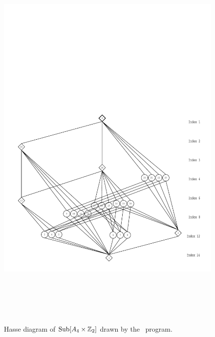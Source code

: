 \begin{enumerate}
\begin{figure}[h!]
\begin{center}
\includegraphics[height=20cm]{inputs/a4c2new.pdf}%
\caption{Hasse diagram of $\mathrm{Sub}[A_4 \times \mathbb{Z}_2]$ drawn by the \xgap\ program.}
\label{fig:a4c2}
\end{center}\end{figure}
\begin{figure}[h!]\begin{center}
\vspace{-8cm}

\end{center}
\end{figure}
\end{enumerate}
